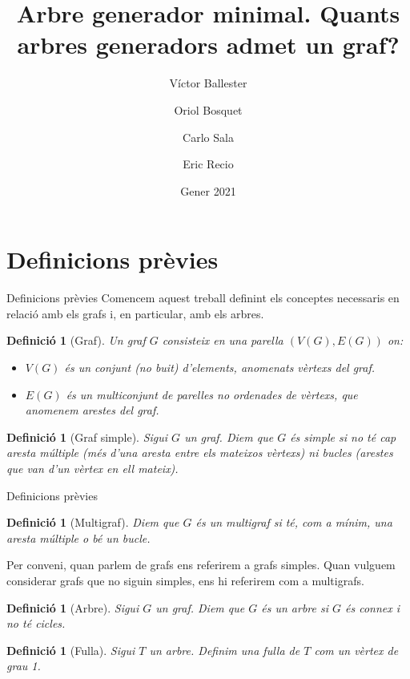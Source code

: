 \documentclass{beamer}
\institute[UAB]{Universitat Autònoma de Barcelona}
\title[Quants arbres generadors admet un graf?]{Arbre generador minimal. Quants arbres generadors admet un graf?}
\author[Víctor, Oriol, Eric, Carlo]{Víctor Ballester\and Oriol Bosquet \and Carlo Sala \and Eric Recio}
\date{Gener 2021}
\newtheorem{defin}[theorem]{Definició}
\begin{document}
\frame{\titlepage}
\section{Definicions prèvies}
\begin{frame}{Definicions prèvies}
    Comencem aquest treball definint els conceptes necessaris en relació amb els grafs i, en particular, amb els arbres.\pause
    \begin{defin}[Graf]
        \normalfont Un graf $G$ consisteix en una parella $(V(G), E(G))$ on:
        \begin{itemize}
            \item $V(G)$ és un conjunt (no buit) d'elements, anomenats vèrtexs del graf.
            \item $E(G)$ és un multiconjunt de parelles no ordenades de vèrtexs, que anomenem arestes del graf.
        \end{itemize}
    \end{defin}\pause
    \begin{defin}[Graf simple]
        \normalfont Sigui $G$ un graf. Diem que $G$ és simple si no té cap aresta múltiple (més d'una aresta entre els mateixos vèrtexs) ni bucles (arestes que van d'un vèrtex en ell mateix).
    \end{defin}
\end{frame}
\begin{frame}{Definicions prèvies}
        \begin{defin}[Multigraf]
        \normalfont Diem que $G$ és un multigraf si té, com a mínim, una aresta múltiple o bé un bucle.
    \end{defin}\pause
    Per conveni, quan parlem de grafs ens referirem a grafs simples. Quan vulguem considerar grafs que no siguin simples, ens hi referirem com a multigrafs.\pause
    \begin{defin}[Arbre]
        \normalfont Sigui $G$ un graf. Diem que $G$ és un arbre si $G$ és connex i no té cicles.
    \end{defin}\pause
    \begin{defin}[Fulla]
    \normalfont Sigui $T$ un arbre. Definim una fulla de $T$ com un vèrtex de grau 1. 
    \end{defin}
\end{frame}
\end{document}
